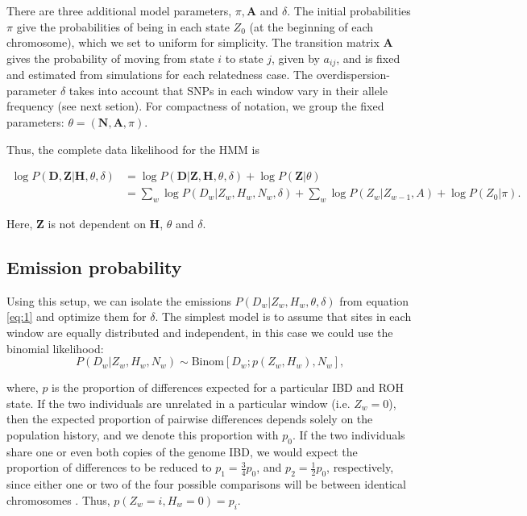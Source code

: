 \documentclass[12pt, letterpaper]{article}
\newcommand{\BZ}{\mathbf{Z}}
\newcommand{\BD}{\mathbf{D}}
\newcommand{\BN}{\mathbf{N}}
\newcommand{\BH}{\mathbf{H}}
\begin{document}
There are three additional model parameters, $\pi, \mathbf{A}$ and $\delta$. The initial probabilities $\pi$ give the probabilities of being in each state $Z_0$ (at the beginning of each chromosome), which we set to uniform for simplicity. The transition matrix $\mathbf{A}$ gives the probability of moving from state $i$ to state $j$, given by $a_{ij}$, and is fixed and estimated from simulations for each relatedness case. The overdispersion-parameter $\delta$ takes into account that SNPs in each window vary in their allele frequency (see next setion).  For compactness of notation, we group the fixed parameters: $\theta = (\BN, \mathbf{A}, \pi)$. 

Thus, the complete data likelihood for the HMM is

\begin{align}\label{eq:1}
\log P(\BD,\BZ|\BH, \theta, \delta) &= \log P(\BD|\BZ,\BH, \theta, \delta) + \log P(\BZ |\theta) \nonumber\\
&= \sum_w \log P(D_w|Z_w,H_w, N_w, \delta) + \sum_w \log P(Z_w |Z_{w-1},A) + \log P(Z_0|\pi)\text{.}
\end{align}

Here, $\BZ$ is not dependent on $\BH$, $\theta$ and $\delta$.

\subsection{Emission probability}\label{B}

Using this setup, we can isolate the emissions $P(D_w | Z_w, H_w ,\theta, \delta)$ from equation \ref{eq:1} and optimize them for $\delta$. The simplest model is to assume that sites in each window are equally distributed and independent, in this case we could use the  binomial likelihood:
$$P(D_w|Z_w, H_w, N_w) \sim \text{Binom}[D_w ; p(Z_w, H_w), N_w] \text{,}$$

where, $p$ is the proportion of differences expected for a particular IBD and ROH state. If the two individuals are unrelated in a particular window (i.e. $Z_w = 0$), then the expected proportion of pairwise differences depends solely on the population history, and we denote this proportion with $p_0$. If the two individuals share one or even both copies of the genome IBD, we would expect the proportion of differences to be reduced to $p_1 = \frac{3}{4} p_0$, and $p_2 = \frac{1}2 p_0$, respectively, since either one or two of the four possible comparisons will be between identical chromosomes \cite{kuhn_estimating_2018}. Thus, $p(Z_w=i, H_w=0) = p_i$.
\end{document}
